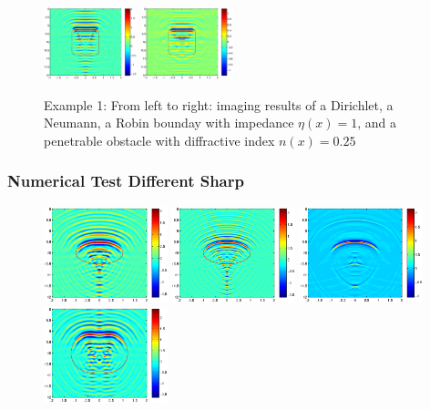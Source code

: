 \documentclass[cjk,8pt]{beamer}
\begin{document}
\begin{CJK*}{GBK}{kai}
\begin{frame}
\begin{figure}
 	\includegraphics[width=0.24\textwidth]{./graphic/rectangle_3pi_impedance_1.eps}
 	\includegraphics[width=0.24\textwidth]{./graphic/rectangle_3pi_transmission.eps}
 	\caption{Example 1: From left to right: imaging results of a Dirichlet, a Neumann, a Robin bounday with impedance $\eta(x)=1$, and a penetrable obstacle with diffractive index $n(x)=0.25$}
 \end{figure}
\end{frame}
\begin{frame}
\frametitle{Numerical Test Different Sharp}
\begin{figure}[h]
	\centering
	\includegraphics[width=0.32\textwidth]{./graphic/circle_3pi.eps}
	\includegraphics[width=0.32\textwidth]{./graphic/circle_5pi.eps}
	\includegraphics[width=0.32\textwidth]{./graphic/circle.eps}\\
	\includegraphics[width=0.32\textwidth]{./graphic/peanut_3pi.eps}

\end{figure}
\end{frame}
\end{CJK*}
\end{document}
